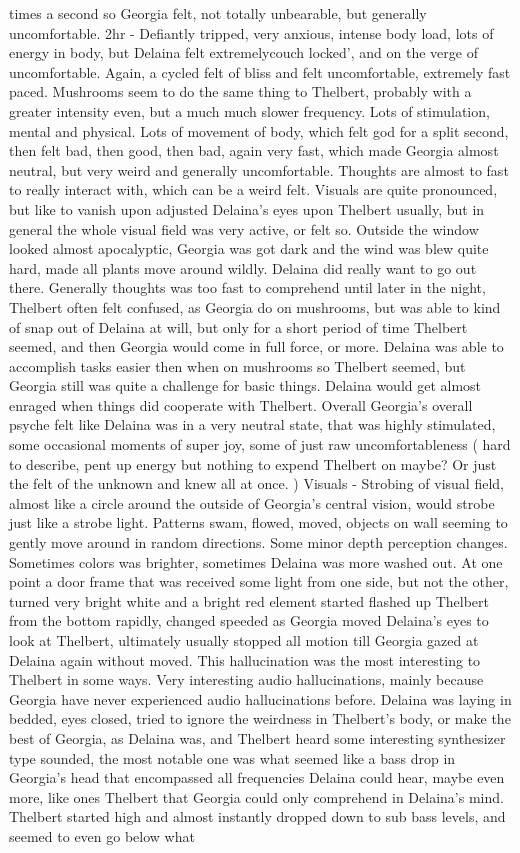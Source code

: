 \documentclass[12pt]{book}
\begin{document}
times a second so Georgia felt, not totally unbearable, but generally uncomfortable. 2hr - Defiantly tripped, very anxious, intense body load, lots of energy in body, but Delaina felt extremelycouch locked', and on the verge of uncomfortable. Again, a cycled felt of bliss and felt uncomfortable, extremely fast paced. Mushrooms seem to do the same thing to Thelbert, probably with a greater intensity even, but a much much slower frequency. Lots of stimulation, mental and physical. Lots of movement of body, which felt god for a split second, then felt bad, then good, then bad, again very fast, which made Georgia almost neutral, but very weird and generally uncomfortable. Thoughts are almost to fast to really interact with, which can be a weird felt. Visuals are quite pronounced, but like to vanish upon adjusted Delaina's eyes upon Thelbert usually, but in general the whole visual field was very active, or felt so. Outside the window looked almost apocalyptic, Georgia was got dark and the wind was blew quite hard, made all plants move around wildly. Delaina did really want to go out there. Generally thoughts was too fast to comprehend until later in the night, Thelbert often felt confused, as Georgia do on mushrooms, but was able to kind of snap out of Delaina at will, but only for a short period of time Thelbert seemed, and then Georgia would come in full force, or more. Delaina was able to accomplish tasks easier then when on mushrooms so Thelbert seemed, but Georgia still was quite a challenge for basic things. Delaina would get almost enraged when things did cooperate with Thelbert. Overall Georgia's overall psyche felt like Delaina was in a very neutral state, that was highly stimulated, some occasional moments of super joy, some of just raw uncomfortableness ( hard to describe, pent up energy but nothing to expend Thelbert on maybe? Or just the felt of the unknown and knew all at once. ) Visuals - Strobing of visual field, almost like a circle around the outside of Georgia's central vision, would strobe just like a strobe light. Patterns swam, flowed, moved, objects on wall seeming to gently move around in random directions. Some minor depth perception changes. Sometimes colors was brighter, sometimes Delaina was more washed out. At one point a door frame that was received some light from one side, but not the other, turned very bright white and a bright red element started flashed up Thelbert from the bottom rapidly, changed speeded as Georgia moved Delaina's eyes to look at Thelbert, ultimately usually stopped all motion till Georgia gazed at Delaina again without moved. This hallucination was the most interesting to Thelbert in some ways. Very interesting audio hallucinations, mainly because Georgia have never experienced audio hallucinations before. Delaina was laying in bedded, eyes closed, tried to ignore the weirdness in Thelbert's body, or make the best of Georgia, as Delaina was, and Thelbert heard some interesting synthesizer type sounded, the most notable one was what seemed like a bass drop in Georgia's head that encompassed all frequencies Delaina could hear, maybe even more, like ones Thelbert that Georgia could only comprehend in Delaina's mind. Thelbert started high and almost instantly dropped down to sub bass levels, and seemed to even go below what 
\end{document}
